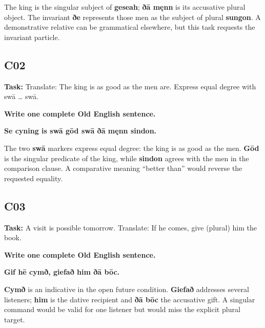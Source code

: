 The king is the singular subject of \textbf{geseah}; \textbf{ðā męnn} is its accusative plural object. The invariant \textbf{ðe} represents those men as the subject of plural \textbf{sungon}. A demonstrative relative can be grammatical elsewhere, but this task requests the invariant particle.

\subsection*{C02}

\textbf{Task:} Translate: The king is as good as the men are. Express equal degree with swā … swā.

\textbf{Write one complete Old English sentence.}

\textbf{Se cyning is swā gōd swā ðā męnn sindon.}

The two \textbf{swā} markers express equal degree: the king is as good as the men. \textbf{Gōd} is the singular predicate of the king, while \textbf{sindon} agrees with the men in the comparison clause. A comparative meaning “better than” would reverse the requested equality.

\par\begin{minipage}{\linewidth}\raggedright
\subsection*{C03}

\textbf{Task:} A visit is possible tomorrow. Translate: If he comes, give (plural) him the book.

\textbf{Write one complete Old English sentence.}

\textbf{Gif hē cymð, giefað him ðā bōc.}

\textbf{Cymð} is an indicative in the open future condition. \textbf{Giefað} addresses several listeners; \textbf{him} is the dative recipient and \textbf{ðā bōc} the accusative gift. A singular command would be valid for one listener but would miss the explicit plural target.
\end{minipage}\par



